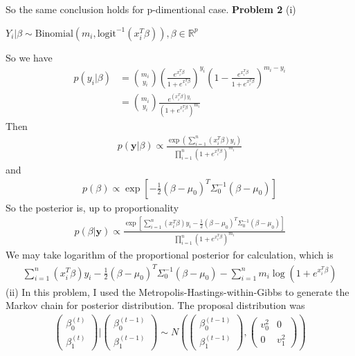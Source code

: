 \documentclass[12pt]{article}
\begin{document}
So the same conclusion holds for p-dimentional case.
\newline
\newline
\textbf{Problem 2} \newline
(i)
\begin{center}
	$Y_i|\beta \sim \text{Binomial}(m_i, \text{logit}^{-1}(x_i^T\beta)), \beta \in \mathbb{R}^p$
\end{center}
So we have
\begin{align*}
	p(y_i|\beta) &= {m_i \choose y_i}(\frac{e^{x_i^T\beta}}{1+e^{x_i^T\beta}})^{y_i}(1 - \frac{e^{x_i^T\beta}}{1+e^{x_i^T\beta}})^{m_i - y_i} \\
	&= {m_i \choose y_i}\frac{e^{(x_i^T\beta)y_i}}{(1+e^{x_i^T\beta})^{m_i}}
\end{align*}
Then
\begin{align*}
	p(\mathbf{y}|\beta) \propto \frac{\exp({\sum_{i=1}^n(x_i^T\beta)y_i})}{\prod_{i=1}^n (1+e^{x_i^T\beta})^{m_i}}
\end{align*}
and
\begin{align*}
	p(\beta) \propto \exp[-\frac{1}{2}(\beta - \mu_0)^T \Sigma_0^{-1} (\beta - \mu_0)]
\end{align*}
So the posterior is, up to proportionality
\begin{align*}
	p(\beta|\mathbf{y}) \propto \frac{\exp[\sum_{i=1}^n(x_i^T\beta)y_i - \frac{1}{2}(\beta - \mu_0)^T \Sigma_0^{-1} (\beta - \mu_0)]}{\prod_{i=1}^n (1+e^{x_i^T\beta})^{m_i}}
\end{align*}
We may take logarithm of the proportional posterior for calculation, which is
\begin{align*}
	\sum_{i=1}^n(x_i^T\beta)y_i - \frac{1}{2}(\beta - \mu_0)^T \Sigma_0^{-1} (\beta - \mu_0) - \sum_{i=1}^n m_i \log(1+e^{x_i^T\beta})
\end{align*}
(ii) In this problem, I used the Metropolis-Hastings-within-Gibbs to generate the Markov chain for posterior distribution. The proposal distribution was
\begin{align*}
	\begin{pmatrix} \beta_0^{(t)} \\ \beta_1^{(t)} \end{pmatrix} | \begin{pmatrix} \beta_0^{(t-1)} \\ \beta_1^{(t-1)} \end{pmatrix} \sim 					N(\begin{pmatrix} \beta_0^{(t-1)} \\ \beta_1^{(t-1)} \end{pmatrix}, \begin{pmatrix} v_0^2 & 0 \\ 0 & v_1^2 \end{pmatrix})
\end{align*}
\end{document}
